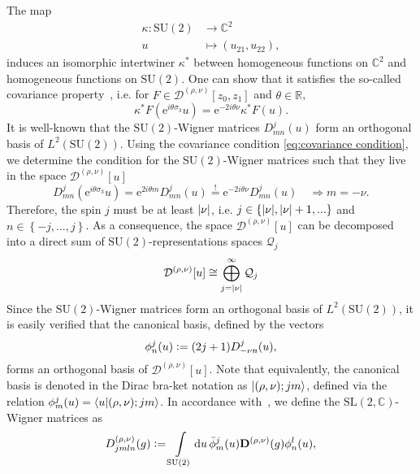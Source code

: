 \documentclass[11pt,a4paper]{article}
\newcommand{\R}{\mathbb R}
\newcommand{\C}{\mathbb C}
\newcommand{\e}{\textrm{e}}
\newcommand{\SU}{\text{SU$(2)$}}
\newcommand{\SL}{\text{SL$(2,\C)$}}
\newcommand{\defeq}{\vcentcolon=}
\begin{document}
The map 
%
\begin{align*}
\kappa: \SU & \longrightarrow \C^2\\[7pt]
u & \longmapsto (u_{21}, u_{22}),
\end{align*}
%
induces an isomorphic intertwiner $\kappa^{*}$ between homogeneous functions on $\C^2$ and homogeneous functions on $\SU$. One can show that it satisfies the so-called covariance property~\cite{Martin-Dussaud:2019ypf}, i.e. for $F\in\mathcal{D}^{(\rho,\nu)}[z_0,z_1]$ and $\theta\in\R$,
%
\begin{equation}\label{eq:covariance condition}
\kappa^{*}F\left(\e^{i\theta\sigma_3}u\right) = \e^{-2i\theta \nu}\kappa^{*}F(u).
\end{equation}
%
It is well-known that the $\SU$-Wigner matrices $D^j_{mn}(u)$ form an orthogonal basis of $L^2(\SU)$. Using the covariance condition \eqref{eq:covariance condition}, we determine the condition for the $\SU$-Wigner matrices such that they live in the space $\mathcal{D}^{(\rho,\nu)}[u]$
%
\begin{equation}\label{eq:covariance condition on Wigner matrices}
D^j_{mn}\left(\e^{i\theta\sigma_3}u\right) = \e^{2i\theta m}D^j_{mn}(u) \overset{!}{=} \e^{-2i\theta \nu}D^j_{mn}(u)\quad\Rightarrow m = -\nu.
\end{equation}
%
Therefore, the spin $j$ must be at least $\abs{\nu}$, i.e. $j\in\left\{\abs{\nu},\abs{\nu}+1,...\right\}$ and $n\in\left\{-j,...,j\right\}$. As a consequence, the space $\mathcal{D}^{(\rho,\nu)}[u]$ can be decomposed into a direct sum of $\SU$-representations spaces $\mathcal{Q}_j$
%
\begin{equation}\label{eq:decomposition of SL2C reps}
\mathcal{D}^{(\rho,\nu)}[u] \cong \bigoplus_{j = \abs{\nu}}^{\infty} \mathcal{Q}_j
\end{equation}
%
Since the $\SU$-Wigner matrices form an orthogonal basis of $L^2(\SU)$, it is easily verified that the canonical basis, defined by the vectors
\begin{equation}
\phi^j_n(u) \defeq (2j+1)D^j_{-\nu n}(u),
\end{equation}
forms an orthogonal basis of $\mathcal{D}^{(\rho,\nu)}[u]$. Note that equivalently, the canonical basis is denoted in the Dirac bra-ket notation as $\ket{(\rho,\nu);jm}$, defined via the relation $\phi^j_m(u) = \braket{u}{(\rho,\nu);jm}$. In accordance with~\cite{Perez:2000ec}, we define the $\SL$-Wigner matrices as
%
\begin{equation}\label{eq:Definition of SL2C Wigner matrices}
D^{(\rho,\nu)}_{jmln}(g)
\defeq
\int\limits_{\SU}\dd{u}\bar{\phi}^j_m(u) \mathbf{D}^{(\rho,\nu)}(g)\phi^l_n(u),
\end{equation}
\end{document}
